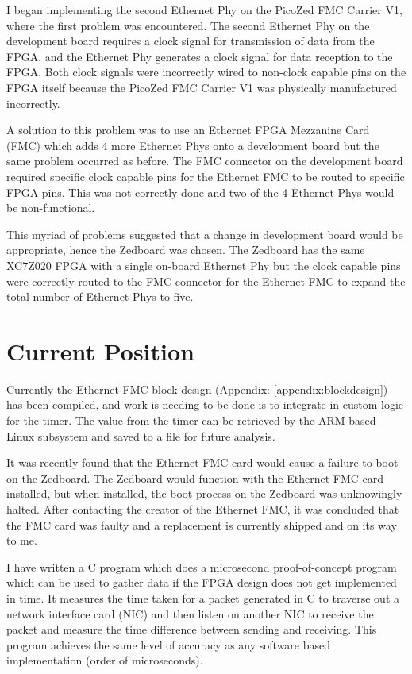 \par I began implementing the second Ethernet Phy on the PicoZed FMC Carrier V1, where the first
problem was encountered. The second Ethernet Phy on the development board requires a clock
signal for transmission of data from the FPGA, and the Ethernet Phy generates a clock signal for data
reception to the FPGA. Both clock signals were incorrectly wired to non-clock capable pins on the
FPGA itself because the PicoZed FMC Carrier V1 was physically manufactured incorrectly.

\par A solution to this problem was to use an Ethernet FPGA Mezzanine Card (FMC) which adds 4 more
Ethernet Phys onto a development board but the same problem occurred as before. The FMC
connector on the development board required specific clock capable pins for the Ethernet FMC to be
routed to specific FPGA pins. This was not correctly done and two of the 4 Ethernet Phys would be
non-functional.

\par This myriad of problems suggested that a change in development board would be appropriate,
hence the Zedboard was chosen. The Zedboard has the same XC7Z020 FPGA with a single on-board
Ethernet Phy but the clock capable pins were correctly routed to the FMC connector for the Ethernet
FMC to expand the total number of Ethernet Phys to five.

\section{Current Position}

\par Currently the Ethernet FMC block design (Appendix: \ref{appendix:blockdesign}) has been compiled, and work is needing to be done is to integrate in custom logic for the timer. The value from the timer can be retrieved by the ARM based Linux subsystem and saved to a file for future analysis. 

\par It was recently found that the Ethernet FMC card would cause a failure to boot on the Zedboard. The
Zedboard would function with the Ethernet FMC card installed, but when installed, the boot process
on the Zedboard was unknowingly halted. After contacting the creator of the Ethernet FMC, it was
concluded that the FMC card was faulty and a replacement is currently shipped and on its way to me.

\par I have written a C program which does a microsecond proof-of-concept program which can be used
to gather data if the FPGA design does not get implemented in time. It measures the time taken for a
packet generated in C to traverse out a network interface card (NIC) and then listen on another NIC
to receive the packet and measure the time difference between sending and receiving. This program
achieves the same level of accuracy as any software based implementation (order of microseconds).
